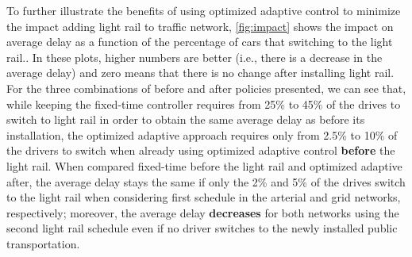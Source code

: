 \begin{figure*}[t!] \centering
%
\caption{Impact on average delay for the arterial (first column) and grid
(second column) networks for both light rail schedules (rows) in different
scenarios (curves) of traffic control system before and after installation of
light rail.
%
The x-axis is the percentage of cars that switching to the public transportation
and the y-axis is the impact after the light rail is installed.
%
Negative impact represents increase in average delay.}
%
\label{fig:impact} \end{figure*}



To further illustrate the benefits of using optimized adaptive control to minimize
the impact adding light rail to traffic network, \cref{fig:impact} shows the
impact on average delay as a function of the percentage of cars that switching
to the light rail..
%
In these plots, higher numbers are better (i.e., there is a decrease in the
average delay) and zero means that there is no change after installing light
rail.
%
For the three combinations of before and after policies presented,
%
%
we can see that, while keeping the fixed-time controller requires from 25\% to
45\% of the drives to switch to light rail in order to obtain the same average
delay as before its installation, the optimized adaptive approach requires only from
2.5\% to 10\% of the drivers to switch when already using optimized adaptive
control \textbf{before} the light rail.
%
When compared fixed-time before the light rail and optimized adaptive after, the
average delay stays the same if only the 2\% and 5\% of the drives switch to the
light rail when considering first schedule in the arterial and grid networks,
respectively;
%
moreover, the average delay \textbf{decreases} for both networks using the
second light rail schedule even if no driver switches to the newly installed
public transportation.

